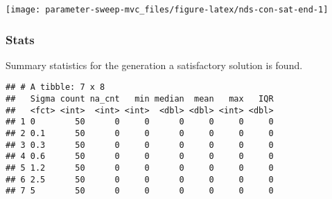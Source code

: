 \documentclass[]{book}
\newenvironment{Shaded}{\begin{snugshade}}{\end{snugshade}}
\newcommand{\DataTypeTok}[1]{\textcolor[rgb]{0.13,0.29,0.53}{#1}}
\newcommand{\DecValTok}[1]{\textcolor[rgb]{0.00,0.00,0.81}{#1}}
\newcommand{\KeywordTok}[1]{\textcolor[rgb]{0.13,0.29,0.53}{\textbf{#1}}}
\newcommand{\NormalTok}[1]{#1}
\newcommand{\OperatorTok}[1]{\textcolor[rgb]{0.81,0.36,0.00}{\textbf{#1}}}
\newcommand{\OtherTok}[1]{\textcolor[rgb]{0.56,0.35,0.01}{#1}}
\newcommand{\StringTok}[1]{\textcolor[rgb]{0.31,0.60,0.02}{#1}}
\begin{document}
\texttt{[image: parameter-sweep-mvc\_files/figure-latex/nds-con-sat-end-1]}

\hypertarget{stats-45}{%
\subsubsection{Stats}\label{stats-45}}

Summary statistics for the generation a satisfactory solution is found.

\begin{Shaded}
\end{Shaded}

\begin{verbatim}
## # A tibble: 7 x 8
##   Sigma count na_cnt   min median  mean   max   IQR
##   <fct> <int>  <int> <int>  <dbl> <dbl> <int> <dbl>
## 1 0        50      0     0      0     0     0     0
## 2 0.1      50      0     0      0     0     0     0
## 3 0.3      50      0     0      0     0     0     0
## 4 0.6      50      0     0      0     0     0     0
## 5 1.2      50      0     0      0     0     0     0
## 6 2.5      50      0     0      0     0     0     0
## 7 5        50      0     0      0     0     0     0
\end{verbatim}
\end{document}
